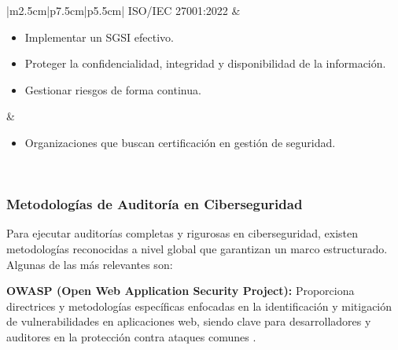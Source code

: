 \documentclass[a4paper, 10pt]{article}
\begin{document}
\begin{table}[H]
\begin{tabular}{|m{2.5cm}|p{7.5cm}|p{5.5cm}|}
ISO/IEC 27001:2022 &
\begin{minipage}[c]{\linewidth}
\begin{itemize} \par\vspace{0.1cm}
  \item Implementar un SGSI efectivo.    
  \item Proteger la confidencialidad, integridad y disponibilidad de la información.
  \item Gestionar riesgos de forma continua.    \par\vspace{0.1cm}

\end{itemize}
\end{minipage} &
\begin{minipage}[c]{\linewidth}
\begin{itemize}
  \item Organizaciones que buscan certificación en gestión de seguridad.
\end{itemize}
\end{minipage} \\ \hline

\end{tabular}
\caption{Comparativa de normativas y estándares en ciberseguridad.}
\label{tabla:normativas}
\end{table}





\par\vspace{0.5cm}


\subsubsection{Metodologías de Auditoría en Ciberseguridad}
\par\vspace{0.5cm}

Para ejecutar auditorías completas y rigurosas en ciberseguridad, existen metodologías reconocidas a nivel global que garantizan un marco estructurado. Algunas de las más relevantes son:
\par\vspace{0.5cm}

\textbf{OWASP (Open Web Application Security Project):} Proporciona directrices y metodologías específicas enfocadas en la identificación y mitigación de vulnerabilidades en aplicaciones web, siendo clave para desarrolladores y auditores en la protección contra ataques comunes \cite{owasp}.
\par\vspace{0.5cm}
\end{document}
